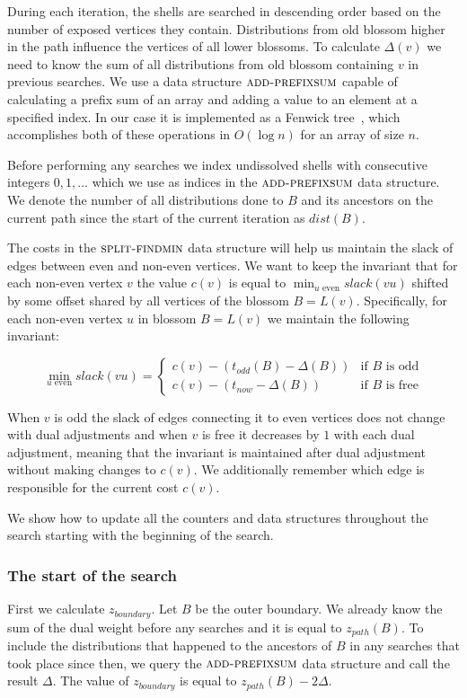 During each iteration, the shells are searched in descending order based on the number of exposed vertices they contain. Distributions from old blossom higher in the path influence the vertices of all lower blossoms. To calculate $\Delta(v)$ we need to know the sum of all distributions from old blossom containing $v$ in previous searches. We use a data structure $\textsc{add-prefixsum}$ capable of calculating a prefix sum of an array and adding a value to an element at a specified index. In our case it is implemented as a Fenwick tree~\cite{Fenwick1994AND}, which accomplishes both of these operations in $O(\log n)$ for an array of size $n$. 

Before performing any searches we index undissolved shells with consecutive integers $0, 1, \dots$ which we use as indices in the $\textsc{add-prefixsum}$ data structure. We denote the number of all distributions done to $B$ and its ancestors on the current path since the start of the current iteration as $dist(B)$.

The costs in the $\textsc{split-findmin}$ data structure will help us maintain the slack of edges between even and non-even vertices. We want to keep the invariant that for each non-even vertex $v$ the value $c(v)$ is equal to $\min_{u\text{ even}} slack(vu)$ shifted by some offset shared by all vertices of the blossom $B = L(v)$. Specifically, for each non-even vertex $u$ in blossom $B = L(v)$ we maintain the following invariant:

\[ 
\min_{u \text{ even}} slack(vu) = \begin{cases}
    c(v) - (t_{odd}(B) - \Delta(B)) & \text{if $B$ is odd} \\
    c(v) - (t_{now} - \Delta(B)) & \text{if $B$ is free}
\end{cases}
\]

When $v$ is odd the slack of edges connecting it to even vertices does not change with dual adjustments and when $v$ is free it decreases by $1$ with each dual adjustment, meaning that the invariant is maintained after dual adjustment without making changes to $c(v)$. We additionally remember which edge is responsible for the current cost $c(v)$.

We show how to update all the counters and data structures throughout the search starting with the beginning of the search. 

\subsubsection*{The start of the search}
First we calculate $z_{boundary}$. Let $B$ be the outer boundary. We already know the sum of the dual weight before any searches and it is equal to $z_{path}(B)$. To include the distributions that happened to the ancestors of $B$ in any searches that took place since then, we query the $\textsc{add-prefixsum}$ data structure and call the result $\Delta$. The value of $z_{boundary}$ is equal to $z_{path}(B) - 2\Delta$. 

